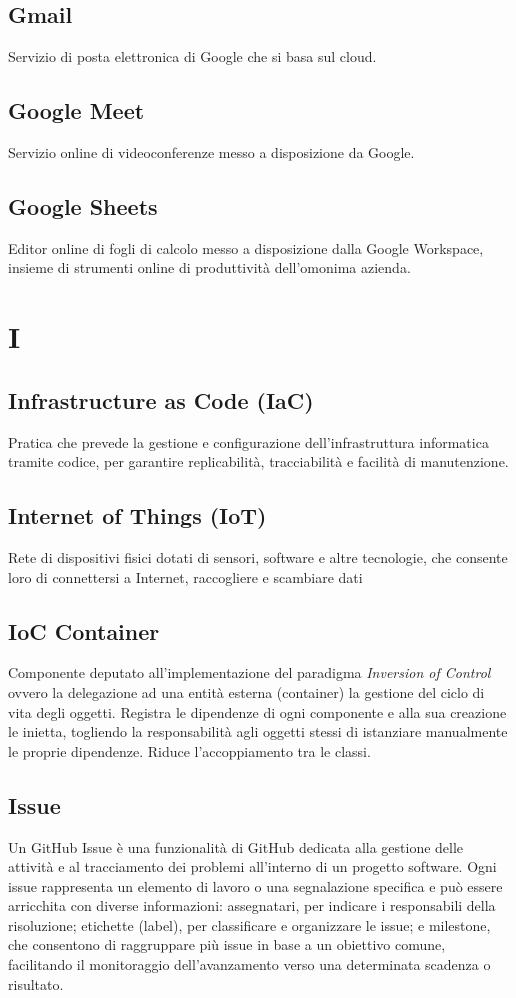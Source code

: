 \documentclass[10pt, letterpaper]{article}
\begin{document}
\subsection*{Gmail}
Servizio di posta elettronica di Google che si basa sul cloud.

\subsection*{Google Meet}
Servizio online di videoconferenze messo a disposizione da Google.

\subsection*{Google Sheets}
Editor online di fogli di calcolo messo a disposizione dalla Google Workspace, insieme di strumenti online di produttività dell'omonima azienda.

\section{I}

\subsection*{Infrastructure as Code (IaC)}
Pratica che prevede la gestione e configurazione dell'infrastruttura informatica tramite codice, per garantire replicabilità, tracciabilità e facilità di manutenzione.

\subsection*{Internet of Things (IoT)}
Rete di dispositivi fisici dotati di sensori, software e altre tecnologie, che consente loro di connettersi a Internet, raccogliere e scambiare dati

\subsection*{IoC Container}
Componente deputato all'implementazione del paradigma \textit{Inversion of Control} ovvero la delegazione ad una entità esterna (container) la gestione del ciclo di vita degli oggetti.
Registra le dipendenze di ogni componente e alla sua creazione le inietta, togliendo la responsabilità agli oggetti stessi di istanziare manualmente le proprie dipendenze.
Riduce l'accoppiamento tra le classi.

\subsection*{Issue}
Un GitHub Issue è una funzionalità di GitHub dedicata alla gestione delle attività e al tracciamento dei problemi all'interno di un progetto software.
Ogni issue rappresenta un elemento di lavoro o una segnalazione specifica e può essere arricchita con diverse informazioni: assegnatari, per indicare i
responsabili della risoluzione; etichette (label), per classificare e organizzare le issue; e milestone, che consentono di raggruppare più issue in base a un
obiettivo comune, facilitando il monitoraggio dell'avanzamento verso una determinata scadenza o risultato.
\end{document}
